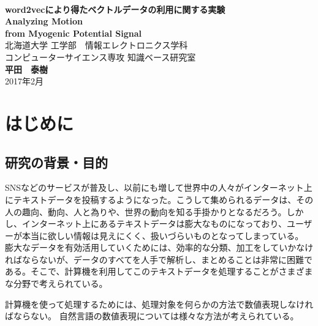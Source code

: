 \documentclass[11pt,a4j,notitlepage]{jreport}
\def\HUGE{\fontsize{32pt}{36pt}\selectfont} %
\begin{document}
%
\begin{titlepage}
\begin{center}\begin{LARGE}
\vspace*{3.5em}{平成28年度　卒業論文}\vspace{1em}\\
\textbf{\HUGE word2vecにより得たベクトルデータの利用に関する実験}\\
\vspace{0.8em}
{\LARGE\bf Analyzing Motion \\from Myogenic Potential Signal}
\vspace{0.28\vsize}\\
{北海道大学 工学部　情報エレクトロニクス学科\\コンピューターサイエンス専攻 知識ベース研究室}\\\vspace{0.8em}
{\Huge\bf 平田　泰樹}\\
\vspace{1em}
{\Large 2017年2月}
\end{LARGE}\end{center}
\end{titlepage}

\tableofcontents

\chapter{はじめに}
\section{研究の背景・目的}
SNSなどのサービスが普及し、以前にも増して世界中の人々がインターネット上にテキストデータを投稿するようになった。こうして集められるデータは、その人の趣向、動向、人と為りや、世界の動向を知る手掛かりとなるだろう。しかし、インターネット上にあるテキストデータは膨大なものになっており、ユーザーが本当に欲しい情報は見えにくく、扱いづらいものとなってしまっている。
膨大なデータを有効活用していくためには、効率的な分類、加工をしていかなければならないが、データのすべてを人手で解析し、まとめることは非常に困難である。そこで、計算機を利用してこのテキストデータを処理することがさまざまな分野で考えられている。

計算機を使って処理するためには、処理対象を何らかの方法で数値表現しなければならない。
自然言語の数値表現については様々な方法が考えられている。
\end{document}
